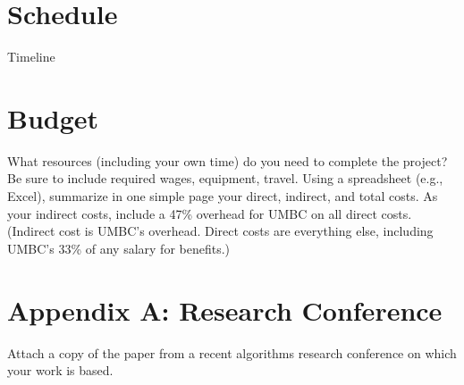 \documentclass[a4paper,11pt]{article}
\begin{document}
\section{Schedule}

Timeline

\section{Budget}

What resources (including your own time) do you need to complete the project? Be sure to include
required wages, equipment, travel. Using a spreadsheet (e.g., Excel), summarize in one simple page your
direct, indirect, and total costs. As your indirect costs, include a 47\% overhead for UMBC on all direct
costs. (Indirect cost is UMBC’s overhead. Direct costs are everything else, including UMBC’s 33\% of
any salary for benefits.)


\section{Appendix A: Research Conference}
Attach a copy of the paper from a recent algorithms research conference on which your work is based.
\end{document}

